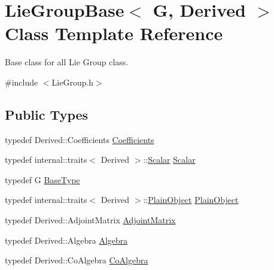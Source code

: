 \hypertarget{class_lie_group_base}{}\section{Lie\+Group\+Base$<$ G, Derived $>$ Class Template Reference}
\label{class_lie_group_base}


Base class for all Lie Group class.  




{\ttfamily \#include $<$Lie\+Group.\+h$>$}

\subsection*{Public Types}
\begin{DoxyCompactItemize}
\item 
typedef Derived\+::\+Coefficients \hyperlink{class_lie_group_base_abb840873afd0a4f54f9ad4265e1d0095}{Coefficients}
\item 
typedef internal\+::traits$<$ Derived $>$\+::\hyperlink{class_lie_group_base_aca48436862e5a14a15b91566440ef964}{Scalar} \hyperlink{class_lie_group_base_aca48436862e5a14a15b91566440ef964}{Scalar}
\item 
typedef G \hyperlink{class_lie_group_base_a895bed679f100c71c6dcbfd5532635b0}{Base\+Type}
\item 
typedef internal\+::traits$<$ Derived $>$\+::\hyperlink{class_lie_group_base_a37b1d64048a2fa65b298801f6028c468}{Plain\+Object} \hyperlink{class_lie_group_base_a37b1d64048a2fa65b298801f6028c468}{Plain\+Object}
\item 
typedef Derived\+::\+Adjoint\+Matrix \hyperlink{class_lie_group_base_ab310fae7cfc1fe04e9d286403f2d4211}{Adjoint\+Matrix}
\item 
typedef Derived\+::\+Algebra \hyperlink{class_lie_group_base_a3730354b1a76881717834e3dfd3187bd}{Algebra}
\item 
typedef Derived\+::\+Co\+Algebra \hyperlink{class_lie_group_base_a7d87259a140110af06f8bca9933b878d}{Co\+Algebra}
\end{DoxyCompactItemize}
